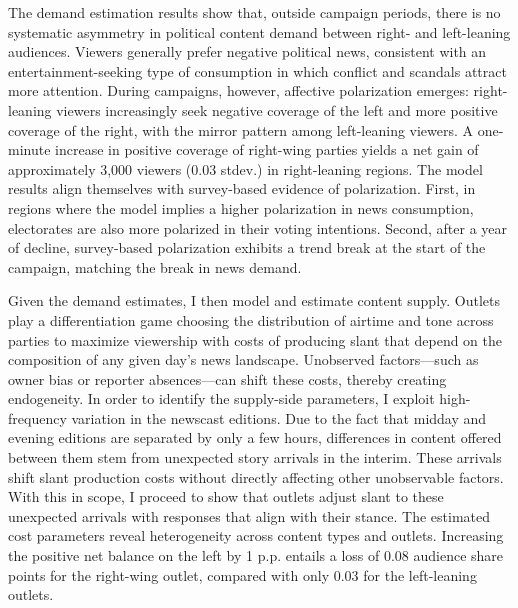 \documentclass[12pt]{article}
\begin{document}





The demand estimation results show that, outside campaign periods, there is no systematic asymmetry in political content demand between right- and left-leaning audiences. Viewers generally prefer negative political news, consistent with an entertainment-seeking type of consumption in which conflict and scandals attract more attention. During campaigns, however, affective polarization emerges: right-leaning viewers increasingly seek negative coverage of the left and more positive coverage of the right, with the mirror pattern among left-leaning viewers. A one-minute increase in positive coverage of right-wing parties yields a net gain of approximately 3,000 viewers (0.03 stdev.)  in right-leaning regions. The model results align  themselves with survey-based evidence of polarization. First, in regions where the model implies a higher polarization in news consumption, electorates are also more polarized in their voting intentions. Second, after a year of decline, survey-based polarization exhibits a trend break at the start of the campaign, matching the break in news demand.





Given the demand estimates, I then model and estimate content supply. Outlets play a differentiation game choosing the distribution of airtime and tone across parties to maximize viewership with costs of producing slant that depend on the composition of any given day's news landscape. Unobserved factors—such as owner bias or reporter absences—can shift these costs, thereby creating endogeneity. In order to identify the supply-side parameters, I exploit high-frequency variation in the newscast editions. Due to the fact that midday and evening editions are separated by only a few hours, differences in content offered between them stem from unexpected story arrivals in the interim. These arrivals shift slant production costs without directly affecting other unobservable factors. With this in scope, I proceed to show that outlets adjust slant to these unexpected arrivals with responses that align  with their stance. The estimated cost parameters reveal heterogeneity  across content types and  outlets. Increasing the positive net balance on the left by 1 p.p. entails a loss of 0.08 audience share points for the right-wing outlet, compared with only 0.03 for the left-leaning outlets. 
\end{document}
